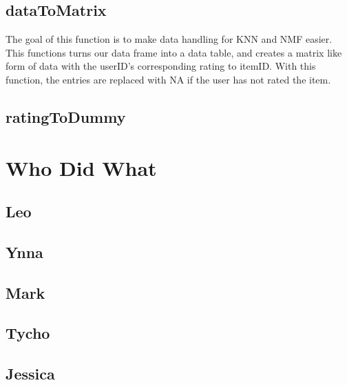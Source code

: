 \documentclass{article}
\begin{document}
\subsection{dataToMatrix}
The goal of this function is to make data handling for KNN and NMF easier. This functions turns our data frame into a data table, and creates a matrix like form of data with the userID's corresponding rating to itemID. With this function, the entries are replaced with NA if the user has not rated the item.

\subsection{ratingToDummy}


\section{Who Did What}
\subsection{Leo}

\subsection{Ynna}

\subsection{Mark}

\subsection{Tycho}

\subsection{Jessica}
\end{document}
